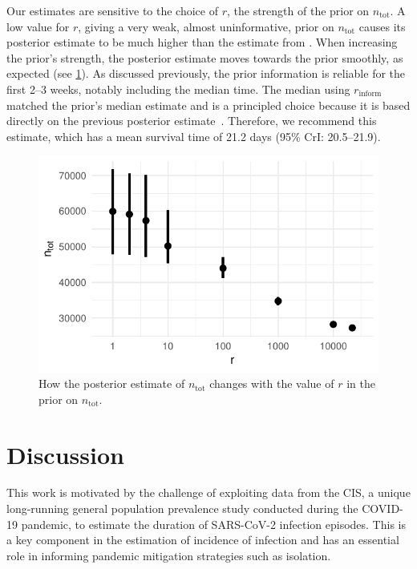 \documentclass[12pt]{article}
\newcommand{\ntot}{n_\text{tot}}
\newcommand{\inform}{{_{\text{inform}}}}
\begin{document}
Our estimates are sensitive to the choice of $r$, the strength of the prior on $\ntot$.
A low value for $r$, giving a very weak, almost uninformative, prior on $\ntot$ causes its posterior estimate to be much higher than the estimate from \citet{birrellRTM2}.
When increasing the prior's strength, the posterior estimate moves towards the prior smoothly, as expected (see \cref{imperf-test:fig:ntot}).
As discussed previously, the prior information is reliable for the first 2--3 weeks, notably including the median time.
The median using $r\inform$ matched the prior's median estimate and is a principled choice because it is based directly on the previous posterior estimate~\citet{birrellRTM2}.
Therefore, we recommend this estimate, which has a mean survival time of 21.2 days (95\% CrI: 20.5--21.9).
\begin{figure}
  \centering \includegraphics{figures/output/CIS_ntot}
  \caption[Sensitivity of $\ntot$'s posterior to its prior.]{How the posterior estimate of $\ntot$ changes with the value of $r$ in the prior on $\ntot$.}
  \label{imperf-test:fig:ntot}
\end{figure}


\section{Discussion} \label{sec:discussion}

This work is motivated by the challenge of exploiting data from the CIS, a unique long-running general population prevalence study conducted during the COVID-19 pandemic, to estimate the duration of SARS-CoV-2 infection episodes.
This is a key component in the estimation of incidence of infection and has an essential role in informing pandemic mitigation strategies such as isolation.
\end{document}
